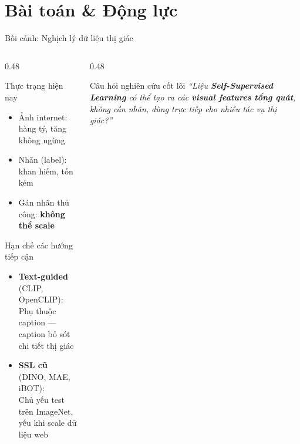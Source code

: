 \documentclass[aspectratio=169]{beamer}
\begin{document}
\section{Bài toán \& Động lực}

\begin{frame}[t,shrink=15]{Bối cảnh: Nghịch lý dữ liệu thị giác}
    \begin{columns}[t]
        \begin{column}{0.48\textwidth}
            \begin{block}{Thực trạng hiện nay}
                \begin{itemize}
                    \item Ảnh internet: \alert{hàng tỷ}, tăng không ngừng
                    \item Nhãn (label): \alert{khan hiếm}, tốn kém
                    \item Gán nhãn thủ công: \textbf{không thể scale}
                \end{itemize}
            \end{block}
            \vspace{0.25cm}
            \begin{alertblock}{Hạn chế các hướng tiếp cận}
                \begin{itemize}
                    \item \textbf{Text-guided} (CLIP, OpenCLIP):\\
                          Phụ thuộc caption --- caption bỏ sót chi tiết thị giác
                    \item \textbf{SSL cũ} (DINO, MAE, iBOT):\\
                          Chủ yếu test trên ImageNet, yếu khi scale dữ liệu web
                \end{itemize}
            \end{alertblock}
        \end{column}
        \begin{column}{0.48\textwidth}
            \begin{exampleblock}{Câu hỏi nghiên cứu cốt lõi}
                \centering\vspace{0.15cm}
                \textit{``Liệu \textbf{Self-Supervised Learning} có thể tạo ra các \textbf{visual features tổng quát}, không cần nhãn, dùng trực tiếp cho nhiều tác vụ thị giác?''}

\end{exampleblock}
\end{column}
\end{columns}
\end{frame}
\end{document}
